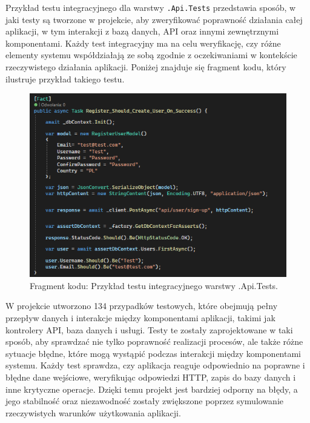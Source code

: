 \documentclass[twoside]{projektInzynierskiMS1}
\begin{document}
\newpage

\noindent 
Przykład testu integracyjnego dla warstwy \texttt{.Api.Tests} przedstawia sposób, w jaki testy są tworzone w projekcie, aby zweryfikować poprawność działania całej aplikacji, w tym interakcji z bazą danych, API oraz innymi zewnętrznymi komponentami. Każdy test integracyjny ma na celu weryfikację, czy różne elementy systemu współdziałają ze sobą zgodnie z oczekiwaniami w kontekście rzeczywistego działania aplikacji. Poniżej znajduje się fragment kodu, który ilustruje przykład takiego testu.

\vspace{0.5cm}
\begin{figure}[h!]
    \centering
    \includegraphics[width=1\textwidth]{images/ex_api_test.png}
    \caption{Fragment kodu: Przykład testu integracyjnego warstwy .Api.Tests.}
\end{figure}
\vspace{0.5cm}

\noindent
W projekcie utworzono 134 przypadków testowych, które obejmują pełny przepływ danych i interakcje między komponentami aplikacji, takimi jak kontrolery API, baza danych i usługi. Testy te zostały zaprojektowane w taki sposób, aby sprawdzać nie tylko poprawność realizacji procesów, ale także różne sytuacje błędne, które mogą wystąpić podczas interakcji między komponentami systemu. Każdy test sprawdza, czy aplikacja reaguje odpowiednio na poprawne i błędne dane wejściowe, weryfikując odpowiedzi HTTP, zapis do bazy danych i inne krytyczne operacje. Dzięki temu projekt jest bardziej odporny na błędy, a jego stabilność oraz niezawodność zostały zwiększone poprzez symulowanie rzeczywistych warunków użytkowania aplikacji.
\end{document}
